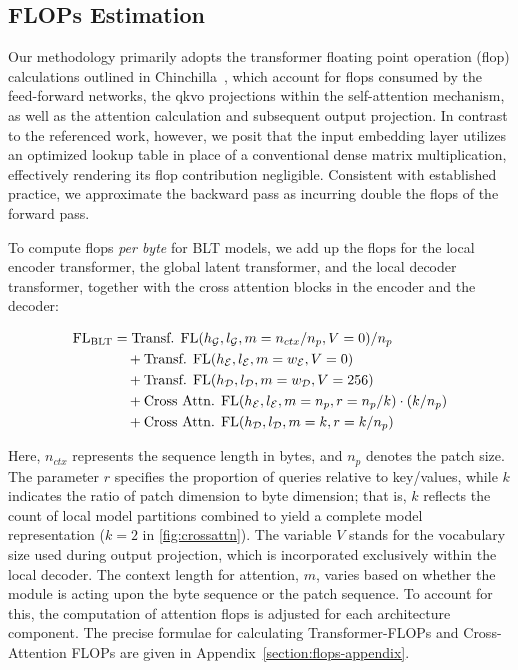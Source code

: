 \subsection{FLOPs Estimation} 
\label{section:flops}

Our methodology primarily adopts the transformer floating point operation (flop) calculations outlined in Chinchilla~\citep{hoffmann2022training}, which account for flops consumed by the feed-forward networks, the qkvo projections within the self-attention mechanism, as well as the attention calculation and subsequent output projection. In contrast to the referenced work, however, we posit that the input embedding layer utilizes an optimized lookup table in place of a conventional dense matrix multiplication, effectively rendering its flop contribution negligible. Consistent with established practice, we approximate the backward pass as incurring double the flops of the forward pass.

To compute flops \textit{per byte} for {\textsc BLT} models, we add up the flops for the local encoder transformer, the global latent transformer, and the local decoder transformer, together with the cross attention blocks in the encoder and the decoder:

\begin{align}
    \text{FL}_{\text{{\textsc BLT}}} &= \text{Transf. FL}(h_{\mathcal{G}}, l_{\mathcal{G}}, m=n_{ctx}/n_p,V=0) / n_p\\
    &\quad +\text{Transf. FL}(h_{\mathcal{E}}, l_{\mathcal{E}}, m=w_{\mathcal{E}}, V=0) \\
    &\quad + \text{Transf. FL}(h_{\mathcal{D}}, l_{\mathcal{D}}, m=w_{\mathcal{D}}, V=256) \\
    &\quad + \text{Cross Attn. FL}(h_{\mathcal{E}}, l_{\mathcal{E}}, m=n_p, r=n_p/k) \cdot (k/n_p) \\
    &\quad + \text{Cross Attn. FL}(h_{\mathcal{D}}, l_{\mathcal{D}}, m=k, r=k/n_p)
\end{align}

Here, $n_{ctx}$ represents the sequence length in bytes, and $n_p$ denotes the patch size. The parameter $r$ specifies the proportion of queries relative to key/values, while $k$ indicates the ratio of patch dimension to byte dimension; that is, $k$ reflects the count of local model partitions combined to yield a complete model representation ($k=2$ in \autoref{fig:crossattn}). The variable $V$ stands for the vocabulary size used during output projection, which is incorporated exclusively within the local decoder. The context length for attention, $m$, varies based on whether the module is acting upon the byte sequence or the patch sequence. To account for this, the computation of attention flops is adjusted for each architecture component. The precise formulae for calculating Transformer-FLOPs and Cross-Attention FLOPs are given in Appendix~\ref{section:flops-appendix}.

